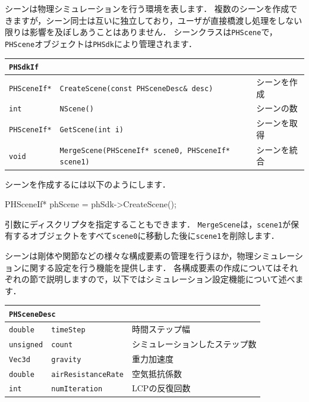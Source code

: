 \KLUDGE シーンは物理シミュレーションを行う環境を表します．
\KLUDGE 複数のシーンを作成できますが，シーン同士は互いに独立しており，ユーザが直接橋渡し処理をしない限りは影響を及ぼしあうことはありません．
\KLUDGE シーンクラスは\texttt{PHScene}で，\texttt{PHScene}オブジェクトは\texttt{PHSdk}により管理されます．

\begin{center}
\begin{tabular}{p{.15\hsize}p{.55\hsize}p{.2\hsize}}
\multicolumn{3}{l}{\texttt{PHSdkIf}}															\\ \midrule
\texttt{PHSceneIf*}	& \texttt{CreateScene(const PHSceneDesc\& desc)}			& シーンを作成		\\
\texttt{int}		& \texttt{NScene()}											& シーンの数		\\
\texttt{PHSceneIf*}	& \texttt{GetScene(int i)}									& シーンを取得		\\
\texttt{void}		& \texttt{MergeScene(PHSceneIf* scene0, PHSceneIf* scene1)}	& シーンを統合		\\
\end{tabular}
\end{center}

\KLUDGE シーンを作成するには以下のようにします．
\begin{sourcecode}
PHSceneIf* phScene = phSdk->CreateScene();
\end{sourcecode}
\KLUDGE 引数にディスクリプタを指定することもできます．
\texttt{MergeScene}は，\texttt{scene1}が保有するオブジェクトをすべて\texttt{scene0}に移動した後に\texttt{scene1}を削除します．

\KLUDGE シーンは剛体や関節などの様々な構成要素の管理を行うほか，物理シミュレーションに関する設定を行う機能を提供します．
\KLUDGE 各構成要素の作成についてはそれぞれの節で説明しますので，以下ではシミュレーション設定機能について述べます．

\begin{center}
\begin{tabular}{p{.15\hsize}p{.35\hsize}p{.4\hsize}}
\multicolumn{3}{l}{\texttt{PHSceneDesc}}										\\ \midrule
\texttt{double}		&	\texttt{timeStep}	& 時間ステップ幅					\\
\texttt{unsigned}	&	\texttt{count}		& シミュレーションしたステップ数	\\
\texttt{Vec3d}		&	\texttt{gravity}	& 重力加速度						\\
\texttt{double}		&	\texttt{airResistanceRate}	& 空気抵抗係数				\\
\texttt{int}		&	\texttt{numIteration}		& LCPの反復回数				\\
\end{tabular}
\end{center}

